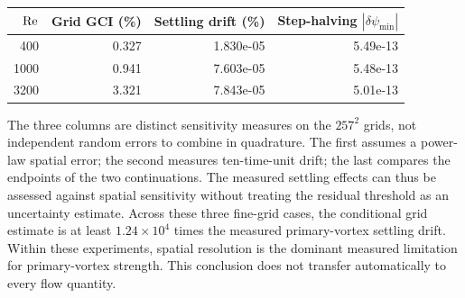\begin{center}\small
\begin{tabular}{@{}rrrr@{}}\toprule
$\mathrm{Re}$ & Grid GCI (\%) & Settling drift (\%) & Step-halving $|\delta\psi_{\min}|$\\\midrule
400 & 0.327 & 1.830e-05 & 5.49e-13\\
1000 & 0.941 & 7.603e-05 & 5.48e-13\\
3200 & 3.321 & 7.843e-05 & 5.01e-13\\
\bottomrule\end{tabular}\end{center}
The three columns are distinct sensitivity measures on the $257^2$ grids, not independent random errors to combine in quadrature. The first assumes a power-law spatial error; the second measures ten-time-unit drift; the last compares the endpoints of the two continuations. The measured settling effects can thus be assessed against spatial sensitivity without treating the residual threshold as an uncertainty estimate.
Across these three fine-grid cases, the conditional grid estimate is at least $1.24\times10^{4}$ times the measured primary-vortex settling drift. Within these experiments, spatial resolution is the dominant measured limitation for primary-vortex strength. This conclusion does not transfer automatically to every flow quantity.
